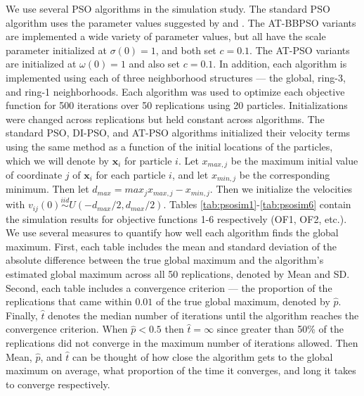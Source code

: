 \documentclass[cmbright]{staauth}
\begin{document}
We use several PSO algorithms in the simulation study. The standard PSO algorithm uses the parameter values suggested by \cite{blum2008swarm} and \cite{clerc2002particle}. The AT-BBPSO variants are implemented a wide variety of parameter values, but all have the scale parameter initialized at $\sigma(0)=1$, and both set $c=0.1$. The AT-PSO variants are initialized at $\omega(0)=1$ and also set $c=0.1$. In addition, each algorithm is implemented using each of three neighborhood structures --- the global, ring-3, and ring-1 neighborhoods. Each algorithm was used to optimize each objective function for 500 iterations over 50 replications using 20 particles. Initializations were changed across replications but held constant across algorithms. The standard PSO, DI-PSO, and AT-PSO algorithms initialized their velocity terms using the same method as a function of the initial locations of the particles, which we will denote by $\bm{x}_i$ for particle $i$. Let $x_{max,j}$ be the maximum initial value of coordinate $j$ of $\bm{x}_i$ for each particle $i$, and let $x_{min,j}$ be the corresponding minimum. Then let $d_{max} = max_{j}x_{max,j} - x_{min,j}$. Then we initialize the velocities with $v_{ij}(0)\stackrel{iid}{\sim}U(-d_{max}/2,d_{max}/2)$. Tables \ref{tab:psosim1}-\ref{tab:psosim6} contain the simulation results for objective functions 1-6 respectively (OF1, OF2, etc.). We use several measures to quantify how well each algorithm finds the global maximum. First, each table includes the mean and standard deviation of the absolute difference between the true global maximum and the algorithm's estimated global maximum across all 50 replications, denoted by Mean and SD. Second, each table includes a convergence criterion --- the proportion of the replications that came within $0.01$ of the true global maximum, denoted by $\widehat{p}$. Finally, $\widehat{t}$ denotes the median number of iterations until the algorithm reaches the convergence criterion. When $\hat{p}<0.5$ then $\hat{t} = \infty$ since greater than 50\% of the replications did not converge in the maximum number of iterations allowed. Then Mean, $\hat{p}$, and $\hat{t}$ can be thought of how close the algorithm gets to the global maximum on average, what proportion of the time it converges, and long it takes to converge respectively.
\end{document}
